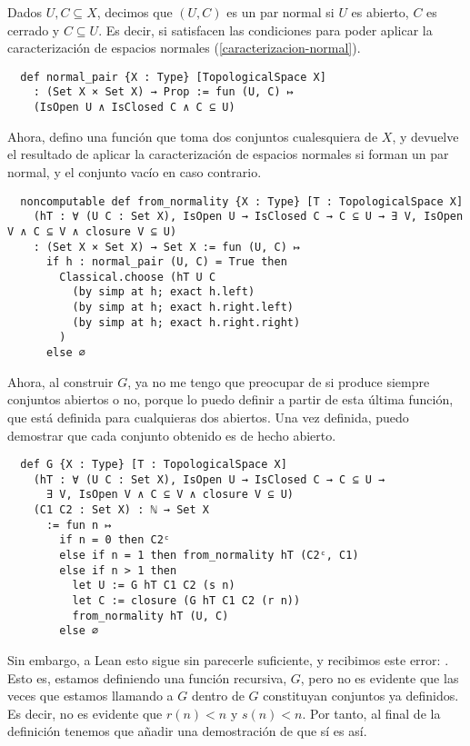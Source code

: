 \begin{definition}
  Dados $U, C \subseteq X$, decimos que $(U, C)$ es un \textnormal{par normal} si $U$ es abierto, $C$ es cerrado y $C \subseteq U$. Es decir, si satisfacen las condiciones para poder aplicar la caracterización de espacios normales (\ref{caracterizacion-normal}).
\end{definition}

\begin{lstlisting}
  def normal_pair {X : Type} [TopologicalSpace X]
    : (Set X × Set X) → Prop := fun (U, C) ↦
    (IsOpen U ∧ IsClosed C ∧ C ⊆ U)
\end{lstlisting}

Ahora, defino una función  que toma dos conjuntos cualesquiera de $X$, y devuelve el resultado de aplicar la caracterización de espacios normales si forman un par normal, y el conjunto vacío en caso contrario.

\begin{lstlisting}
  noncomputable def from_normality {X : Type} [T : TopologicalSpace X]
    (hT : ∀ (U C : Set X), IsOpen U → IsClosed C → C ⊆ U → ∃ V, IsOpen V ∧ C ⊆ V ∧ closure V ⊆ U)
    : (Set X × Set X) → Set X := fun (U, C) ↦
      if h : normal_pair (U, C) = True then
        Classical.choose (hT U C
          (by simp at h; exact h.left)
          (by simp at h; exact h.right.left)
          (by simp at h; exact h.right.right)
        )
      else ∅
\end{lstlisting}

Ahora, al construir $G$, ya no me tengo que preocupar de si produce siempre conjuntos abiertos o no, porque lo puedo definir a partir de esta última función, que está definida para cualquieras dos abiertos. Una vez definida, puedo demostrar que cada conjunto obtenido es de hecho abierto.

\begin{lstlisting}
  def G {X : Type} [T : TopologicalSpace X]
    (hT : ∀ (U C : Set X), IsOpen U → IsClosed C → C ⊆ U →
      ∃ V, IsOpen V ∧ C ⊆ V ∧ closure V ⊆ U)
    (C1 C2 : Set X) : ℕ → Set X
      := fun n ↦
        if n = 0 then C2ᶜ
        else if n = 1 then from_normality hT (C2ᶜ, C1)
        else if n > 1 then
          let U := G hT C1 C2 (s n)
          let C := closure (G hT C1 C2 (r n))
          from_normality hT (U, C)
        else ∅
\end{lstlisting}

Sin embargo, a Lean esto sigue sin parecerle suficiente, y recibimos este error: . Esto es, estamos definiendo una función recursiva, $G$, pero no es evidente que las veces que estamos llamando a $G$ dentro de $G$ constituyan conjuntos ya definidos. Es decir, no es evidente que $r(n) < n$ y $s(n) < n$. Por tanto, al final de la definición tenemos que añadir una demostración de que sí es así.

